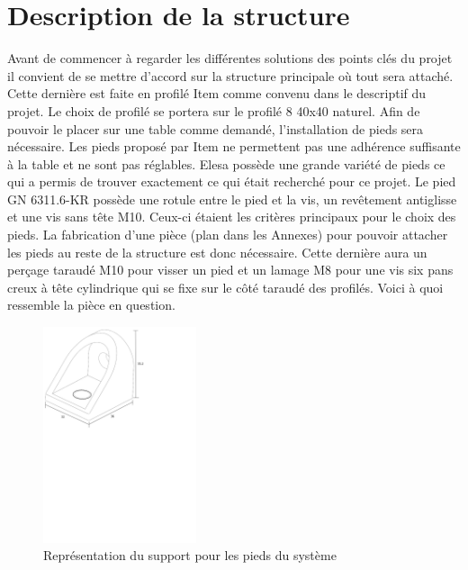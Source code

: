 \section{Description de la structure}\label{sec:DescStruct}
Avant de commencer à regarder les différentes solutions des points clés du projet il convient de se mettre d'accord
sur la structure principale où tout sera attaché. Cette dernière est faite en profilé Item \cite{Item} comme convenu dans le descriptif
du projet. Le choix de profilé se portera sur le profilé 8 40x40 naturel. Afin de pouvoir le placer sur une table comme demandé, l'installation de pieds sera nécessaire. Les pieds proposé par Item ne
permettent pas une adhérence suffisante à la table et ne sont pas réglables. Elesa \cite{Elesa} possède une grande variété de pieds ce qui
a permis de trouver exactement ce qui était recherché pour ce projet. Le pied GN 6311.6-KR possède une rotule entre le pied
et la vis, un revêtement antiglisse et une vis sans tête M10. Ceux-ci étaient les critères principaux pour le choix des pieds. La fabrication d'une pièce (plan dans les Annexes) pour pouvoir attacher
les pieds au reste de la structure est donc nécessaire. Cette dernière aura un perçage taraudé M10 pour visser un pied et un lamage M8 pour
une vis six pans creux à tête cylindrique qui se fixe sur le côté taraudé des profilés. Voici à quoi ressemble la pièce en question.

\begin{figure}[H]
  \centering
  \includegraphics[width = 0.4\textwidth]{assets/figures/SupportPieds.svg}
  \caption{Représentation du support pour les pieds du système}
  \label{fig:SupPieds}
\end{figure}

